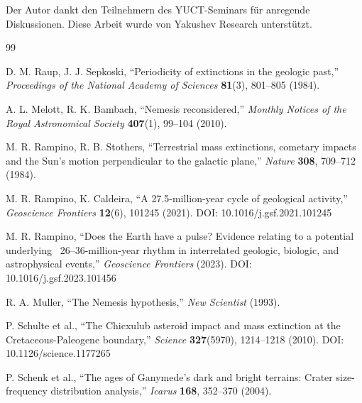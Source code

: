 \documentclass[11pt,a4paper]{article}
\begin{document}
	Der Autor dankt den Teilnehmern des YUCT-Seminars für anregende Diskussionen. Diese Arbeit wurde von Yakushev Research unterstützt.
	
	
	\begin{thebibliography}{99}
		
		D. M. Raup, J. J. Sepkoski, ``Periodicity of extinctions in the geologic past,''
		\emph{Proceedings of the National Academy of Sciences} \textbf{81}(3), 801–805 (1984).
		
		A. L. Melott, R. K. Bambach, ``Nemesis reconsidered,''
		\emph{Monthly Notices of the Royal Astronomical Society} \textbf{407}(1), 99–104 (2010).
		
		M. R. Rampino, R. B. Stothers, ``Terrestrial mass extinctions, cometary impacts and the Sun's motion perpendicular to the galactic plane,''
		\emph{Nature} \textbf{308}, 709–712 (1984).
		
		M. R. Rampino, K. Caldeira, ``A 27.5-million-year cycle of geological activity,''
		\emph{Geoscience Frontiers} \textbf{12}(6), 101245 (2021). DOI: 10.1016/j.gsf.2021.101245
		
		M. R. Rampino, ``Does the Earth have a pulse? Evidence relating to a potential underlying ~26–36-million-year rhythm in interrelated geologic, biologic, and astrophysical events,''
		\emph{Geoscience Frontiers} (2023). DOI: 10.1016/j.gsf.2023.101456
		
		R. A. Muller, ``The Nemesis hypothesis,''
		\emph{New Scientist} (1993).
		
		P. Schulte et al., ``The Chicxulub asteroid impact and mass extinction at the Cretaceous-Paleogene boundary,''
		\emph{Science} \textbf{327}(5970), 1214–1218 (2010). DOI: 10.1126/science.1177265
		
		P. Schenk et al., ``The ages of Ganymede's dark and bright terrains: Crater size-frequency distribution analysis,''
		\emph{Icarus} \textbf{168}, 352–370 (2004).
		

\end{thebibliography}
\end{document}

